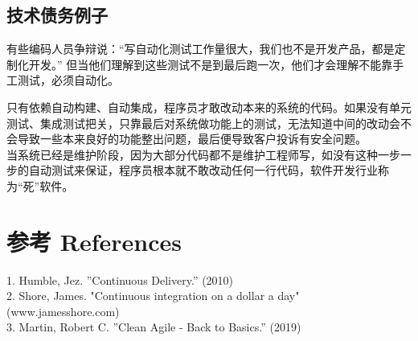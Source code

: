 \begin{description}
\item[]
\end{description}

\hypertarget{ux6280ux672fux503aux52a1ux4f8bux5b50}{%
\subsection{技术债务例子}\label{ux6280ux672fux503aux52a1ux4f8bux5b50}}


有些编码人员争辩说：``写自动化测试工作量很大，我们也不是开发产品，都是定制化开发。''
但当他们理解到这些测试不是到最后跑一次，他们才会理解不能靠手工测试，必须自动化。

只有依赖自动构建、自动集成，程序员才敢改动本来的系统的代码。如果没有单元测试、集成测试把关，只靠最后对系统做功能上的测试，无法知道中间的改动会不会导致一些本来良好的功能整出问题，最后便导致客户投诉有安全问题。\\
当系统已经是维护阶段，因为大部分代码都不是维护工程师写，如没有这种一步一步的自动测试来保证，程序员根本就不敢改动任何一行代码，软件开发行业称为``死''软件。\\

\hypertarget{ux9644ux4ef6}{%
\section{参考 References}\label{ux9644ux4ef6}}

1. Humble, Jez. ''Continuous Delivery.'' (2010) \\
2. Shore, James. "Continuous integration on a dollar a day" (www.jamesshore.com)\\
3. Martin, Robert C. ''Clean Agile - Back to Basics.'' (2019)\\




